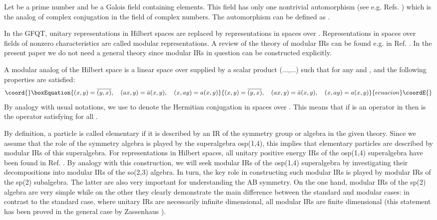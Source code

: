 \documentclass[a4paper,12pt]{article}%
\begin{document}
Let \coordHE{} be a prime number and \coordHE{} be a Galois field
containing \coordHE{} elements. This field has only one
nontrivial automorphism \coordHE{} (see e.g.
Refs. \cite{VDW,lev2}) which is the analog of complex
conjugation in the field of complex numbers. The automorphism
can be defined as \coordHE{} \cite{VDW}. 

In the GFQT, unitary representations in Hilbert spaces are
replaced by representations in spaces over \coordHE{}. 
Representations in spaces over fields
of nonzero characteristics are called modular representations.
A review of the theory of modular IRs can be found e.g. in
Ref. \cite{FrPa}. In the present paper we do not need a
general theory since modular IRs in question can be
constructed explicitly.

A modular analog of the Hilbert
space is a linear space \coordHE{} over \coordHE{} supplied by a
scalar product (...,...) such that for any \coordHE{}
and \coordHE{}, \coordHE{}
and the following properties are satisfied: 
\begin{equation}\coord{}\boxEquation{
(x,y) =\overline{(y,x)},\quad (ax,y)=\bar{a}(x,y),\quad 
(x,ay)=a(x,y)
\label{1}
}{
(x,y) =\overline{(y,x)},\quad (ax,y)=\bar{a}(x,y),\quad 
(x,ay)=a(x,y)
}{ecuacion}\coordE{}\end{equation}   
By analogy with usual notations, we use \myHighlight{$^*$}\coordHE{} to denote 
the Hermitian conjugation in spaces over \coordHE{}. This means
that if \coordHE{} is an operator in \coordHE{} then \coordHE{} is the operator
satisfying \coordHE{} for all \coordHE{}.

By definition, a particle is called elementary if it is
described by an IR of the symmetry group or algebra in the
given theory. Since we assume that the role of the symmetry
algebra is played by the superalgebra osp(1,4), this implies 
that elementary particles are described by modular IRs of 
this superalgebra. For representations in Hilbert spaces,
all unitary positive energy IRs of the osp(1,4) superalgebra
have been found in Ref.
\cite{Heidenreich}. By analogy with this construction, we
will seek modular IRs of the osp(1,4) superalgebra by
investigating their decompositions into modular IRs of
the so(2,3) algebra.  In turn, the key role in 
constructing such modular IRs is played by modular IRs 
of the sp(2) subalgebra. The latter are also very 
important for understanding the
AB symmetry. On the one hand, modular IRs of the sp(2) 
algebra are very simple while on the other they clearly
demonstrate the main difference between the standard and
modular cases: in contrast to the standard case, where 
unitary IRs are necessarily infinite dimensional, all
modular IRs are finite dimensional (this statement has
been proved in the general case by Zassenhaus \cite{Zass}).
\end{document}
